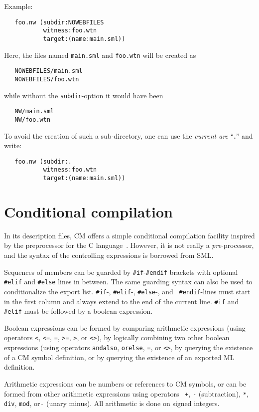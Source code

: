 \documentclass[titlepage,letterpaper]{article}
\begin{document}
Example:

\begin{verbatim}
   foo.nw (subdir:NOWEBFILES
           witness:foo.wtn
           target:(name:main.sml))
\end{verbatim}

Here, the files named {\tt main.sml} and {\tt foo.wtn} will be
created as
\begin{verbatim}
   NOWEBFILES/main.sml
   NOWEBFILES/foo.wtn
\end{verbatim}
\noindent while without the {\tt subdir}-option it would have been
\begin{verbatim}
   NW/main.sml
   NW/foo.wtn
\end{verbatim}
\noindent To avoid the creation of such a sub-directory, one can use
the {\em current arc} ``{\bf .}'' and write:
\begin{verbatim}
   foo.nw (subdir:.
           witness:foo.wtn
           target:(name:main.sml))
\end{verbatim}

\section{Conditional compilation}
\label{sec:preproc}

In its description files, CM offers a simple conditional compilation
facility inspired by the preprocessor for the C language~\cite{k&r2}.
However, it is not really a {\it pre}-processor, and the syntax of the
controlling expressions is borrowed from SML.

Sequences of members can be guarded by {\tt \#if}-{\tt \#endif}
brackets with optional {\tt \#elif} and {\tt \#else} lines in between.
The same guarding syntax can also be used to conditionalize the export
list.  {\tt \#if}-, {\tt \#elif}-, {\tt \#else}-, and {\tt
\#endif}-lines must start in the first column and always
extend to the end of the current line.  {\tt \#if} and {\tt \#elif}
must be followed by a boolean expression.

Boolean expressions can be formed by comparing arithmetic expressions
(using operators {\tt <}, {\tt <=}, {\tt =}, {\tt >=}, {\tt >}, or
{\tt <>}), by logically combining two other boolean expressions (using
operators {\tt andalso}, {\tt orelse}, {\tt =}, or {\tt <>}, by
querying the existence of a CM symbol definition, or by querying the
existence of an exported ML definition.

Arithmetic expressions can be numbers or references to CM symbols, or
can be formed from other arithmetic expressions using operators {\tt
+}, {\tt -} (subtraction), \verb|*|, {\tt div}, {\tt mod}, or $\tilde{~}$
(unary minus).  All arithmetic is done on signed integers.
\end{document}
